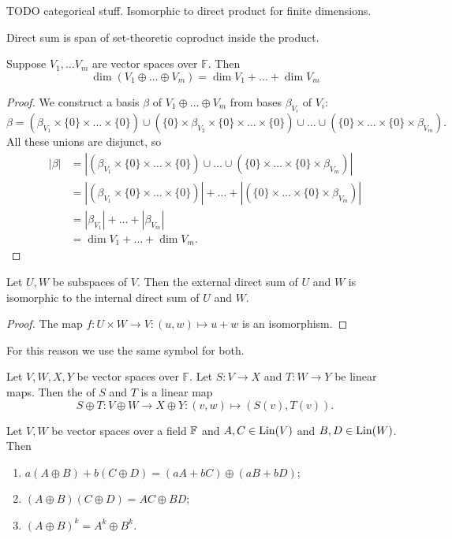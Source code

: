 TODO categorical stuff. Isomorphic to direct product for finite dimensions.

\begin{proposition}
Direct sum is span of set-theoretic coproduct inside the product.
\end{proposition}


\begin{proposition}
Suppose $V_1, \ldots V_m$ are vector spaces over $\mathbb{F}$. Then
\[ \dim(V_1\oplus\ldots \oplus V_m) = \dim V_1 + \ldots + \dim V_m \]
\label{dimDirectSum}
\end{proposition}
\begin{proof}
We construct a basis $\beta$ of $V_1\oplus\ldots \oplus V_m$ from bases $\beta_{V_i}$ of $V_i$:
\[ \beta = (\beta_{V_1} \times \{0 \} \times \ldots \times \{0 \}) \cup (\{0 \} \times \beta_{V_2}\times \{0 \} \times \ldots \times \{0 \}) \cup \ldots \cup (\{0 \}\times \ldots \times \{0 \} \times \beta_{V_m}). \]
All these unions are disjunct, so
\begin{align*}
|\beta| &= |(\beta_{V_1} \times \{0 \} \times \ldots \times \{0 \}) \cup  \ldots \cup (\{0 \}\times \ldots \times \{0 \} \times \beta_{V_m})| \\
&= |(\beta_{V_1} \times \{0 \} \times \ldots \times \{0 \})| + \ldots + |(\{0 \}\times \ldots \times \{0 \} \times \beta_{V_m})| \\
&= | \beta_{V_1}| + \ldots + |\beta_{V_m}| \\
&= \dim V_1 + \ldots + \dim V_m.
\end{align*}
\end{proof}

\begin{proposition}
Let $U,W$ be subspaces of $V$. Then the external direct sum of $U$ and $W$ is isomorphic to the internal direct sum of $U$ and $W$.
\end{proposition}
\begin{proof}
The map $f: U\times W\to V: (u,w) \mapsto u+w$ is an isomorphism.
\end{proof}
For this reason we use the same symbol for both.

\begin{definition}
Let $V,W, X,Y$ be vector spaces over $\mathbb{F}$. Let $S: V\to X$ and $T: W\to Y$ be linear maps. Then the  of $S$ and $T$ is a linear map
\[ S\oplus T: V \oplus W \to X\oplus Y: (v,w) \mapsto (S(v), T(v)). \]
\end{definition}

\begin{lemma}
Let $V,W$ be vector spaces over a field $\mathbb{F}$ and $A,C\in\operatorname{Lin}(V)$ and $B,D\in\operatorname{Lin}(W)$. Then
\begin{enumerate}
\item $a(A\oplus B) + b(C\oplus D) = (aA+bC)\oplus (aB + bD)$;
\item $(A\oplus B)(C\oplus D) = AC\oplus BD$;
\item $(A\oplus B)^k = A^k\oplus B^k$.
\end{enumerate}
\end{lemma}

